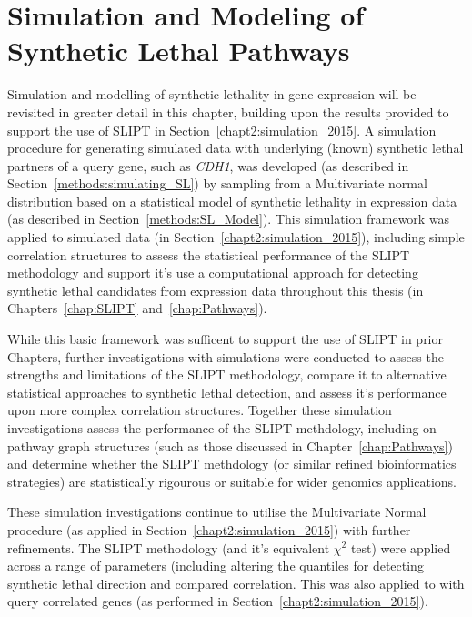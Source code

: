 \chapter{Simulation and Modeling of Synthetic Lethal Pathways}
\label{chap:simulation}

Simulation and modelling of synthetic lethality in gene expression will be revisited in greater detail in this chapter, building upon the results provided to support the use of \gls{SLIPT} in Section~\ref{chapt2:simulation_2015}. A simulation procedure for generating simulated data with underlying (known) synthetic lethal partners of a query gene, such as \textit{CDH1}, was developed (as described in Section~\ref{methods:simulating_SL}) by sampling from a Multivariate normal distribution based on a statistical model of synthetic lethality in expression data (as described in Section~\ref{methods:SL_Model}). This simulation framework was applied to simulated data (in Section~\ref{chapt2:simulation_2015}), including simple correlation structures to assess the statistical performance of the \gls{SLIPT} methodology and support it's use a computational approach for detecting synthetic lethal candidates from expression data throughout this thesis (in Chapters~\ref{chap:SLIPT} and~\ref{chap:Pathways}). 

While this basic framework was sufficent to support the use of \gls{SLIPT} in prior Chapters, further investigations with simulations were conducted to assess the strengths and limitations of the \gls{SLIPT} methodology, compare it to alternative statistical approaches to synthetic lethal detection, and assess it's performance upon more complex correlation structures. Together these simulation investigations assess the performance of the \gls{SLIPT} methdology, including on pathway graph structures (such as those discussed in Chapter~\ref{chap:Pathways}) and determine whether the \gls{SLIPT} methdology (or similar refined bioinformatics strategies) are statistically rigourous or suitable for wider genomics applications.

These simulation investigations continue to utilise the Multivariate Normal procedure (as applied in Section~\ref{chapt2:simulation_2015}) with further refinements. The \gls{SLIPT} methodology (and it's equivalent $\chi^2$ test) were applied across a range of parameters (including altering the quantiles for detecting synthetic lethal direction and compared correlation. This was also applied to with query correlated genes (as performed in Section~\ref{chapt2:simulation_2015}).

